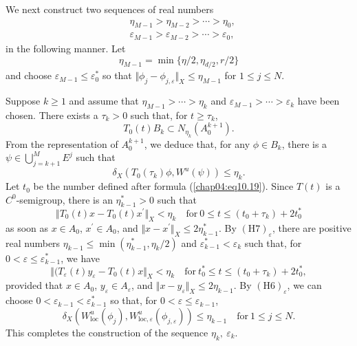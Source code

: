 \documentclass{surv-l}
\theoremstyle{plain}
\theoremstyle{definition}
\numberwithin{equation}{section}
\numberwithin{figure}{chapter}
\begin{document}
We next construct two sequences of real numbers
\begin{align*}
&\eta_{M-1}>\eta_{M-2}>\cdots>\eta_{0},\\
&\varepsilon_{M-1}>\varepsilon_{M-2}>\cdots>\varepsilon_{0},
\end{align*}
in the following manner. Let
\begin{equation*}
\eta_{M-1}=\min\{\eta/2,\eta_{d/2},r/2\}
\end{equation*}
and choose $\varepsilon_{M-1}\leq\varepsilon_{0}^{\ast}$ so that $\Vert\phi_{j}-\phi_{j,\varepsilon}\Vert_{X}\leq\eta_{M-1}$ for $1\leq j\leq N$.

Suppose $k\geq 1$ and assume that $\eta_{M-1}>\cdots>\eta_{k}$ and $\varepsilon_{M-1}> \cdots>\varepsilon_{k}$ have been chosen. There exists a $\tau_{k}>0$ such that, for $t\geq\tau_{k}$,
\begin{equation}\label{chap04:eq10.24}
T_{0}(t)B_{k}\subset N_{\eta_{k}}(A_{0}^{k+1}).
\end{equation}
From the representation of $A_{0}^{k+1}$, we deduce that, for any $\phi \in B_{k}$, there is a $\psi\in\bigcup_{j=k+1}^{M}E^{j}$ such that
\begin{equation*}
\delta_{X}(T_{0}(\tau_{k})\phi, W^{u}(\psi))\leq\eta_{k}.
\end{equation*}
Let $t_{0}$ be the number defined after formula (\ref{chap04:eq10.19}). Since $T(t)$ is a $C^{0}$-semigroup, there is an $\eta_{k-1}^{\ast}>0$ such that
\begin{equation}\label{chap04:eq10.25}
\Vert T_{0}(t)x-T_{0}(t)x^{\prime}\Vert_{X}<\eta_{k}\quad\mathrm{for}\ 0\leq t\leq(t_{0}+\tau_{k})+2t_{0}^{\ast}
\end{equation}
as soon as $x\in A_{0}$, $x^{\prime}\in A_{0}$, and $\Vert x-x^{\prime}\Vert_{X}\leq 2\eta_{k-1}^{\ast}$. By $\mathrm{(H7)}_{\varepsilon}$, there are positive real numbers $\eta_{k-1}\leq\min(\eta_{k-1}^{\ast},\eta_{k}/2)$ and $\varepsilon_{k-1}^{\ast}<\varepsilon_{k}$ such that, for $ 0<\varepsilon \leq\varepsilon_{k-1}^{\ast}$, we have
\begin{equation}\label{chap04:eq10.26}
\Vert(T_{\varepsilon}(t)y_{\varepsilon}-T_{0}(t)x\Vert_{X}<\eta_{k}\quad\mathrm{for}\ t_{0}^{\ast}\leq t\leq(t_{0}+\tau_{k})+2t_{0}^{\ast},
\end{equation}
provided that $x\in A_{0}$, $y_{\varepsilon}\in A_{\varepsilon}$, and $\Vert x-y_{\varepsilon}\Vert_{X}\leq 2\eta_{k-1}$. By $\mathrm{(H6)}_{\varepsilon}$, we can choose $0<\varepsilon_{k-1}<\varepsilon_{k-1}^{\ast}$ so that, for $ 0<\varepsilon \leq\varepsilon_{k-1}$,
\begin{equation}\label{chap04:eq10.27}
\delta_{X}(W_{\mathrm{loc}}^{u}(\phi_{j}), W_{\mathrm{loc},\varepsilon}^{u}(\phi_{j,\varepsilon}))\leq\eta_{k-1}\quad\mathrm{for}\ 1\leq j\leq N.
\end{equation}
This completes the construction of the sequence $\eta_{k},\ \varepsilon_{k}$.
\end{document}

